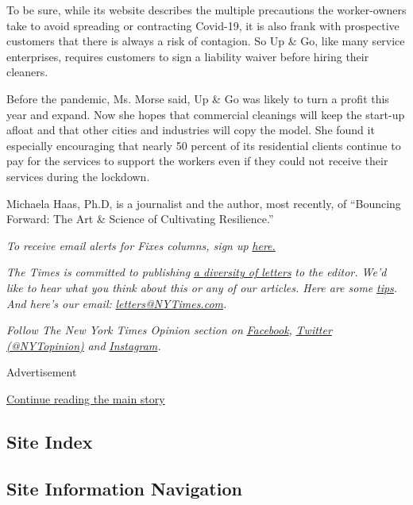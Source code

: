To be sure, while its website describes the multiple precautions the
worker-owners take to avoid spreading or contracting Covid-19, it is
also frank with prospective customers that there is always a risk of
contagion. So Up \& Go, like many service enterprises, requires
customers to sign a liability waiver before hiring their cleaners.

Before the pandemic, Ms. Morse said, Up \& Go was likely to turn a
profit this year and expand. Now she hopes that commercial cleanings
will keep the start-up afloat and that other cities and industries will
copy the model. She found it especially encouraging that nearly 50
percent of its residential clients continue to pay for the services to
support the workers even if they could not receive their services during
the lockdown.

Michaela Haas, Ph.D, is a journalist and the author, most recently, of
``Bouncing Forward: The Art \& Science of Cultivating Resilience.''

\emph{To receive email alerts for Fixes columns, sign up}
\href{http://eepurl.com/ABIxL}{\emph{here.}}

\emph{The Times is committed to publishing}
\href{https://www.nytimes3xbfgragh.onion/2019/01/31/opinion/letters/letters-to-editor-new-york-times-women.html}{\emph{a
diversity of letters}} \emph{to the editor. We'd like to hear what you
think about this or any of our articles. Here are some}
\href{https://help.nytimes3xbfgragh.onion/hc/en-us/articles/115014925288-How-to-submit-a-letter-to-the-editor}{\emph{tips}}\emph{.
And here's our email:}
\href{mailto:letters@NYTimes.com}{\emph{letters@NYTimes.com}}\emph{.}

\emph{Follow The New York Times Opinion section on}
\href{https://www.facebookcorewwwi.onion/nytopinion}{\emph{Facebook}}\emph{,}
\href{http://twitter.com/NYTOpinion}{\emph{Twitter (@NYTopinion)}}
\emph{and}
\href{https://www.instagram.com/nytopinion/}{\emph{Instagram}}\emph{.}

Advertisement

\protect\hyperlink{after-bottom}{Continue reading the main story}

\hypertarget{site-index}{%
\subsection{Site Index}\label{site-index}}

\hypertarget{site-information-navigation}{%
\subsection{Site Information
Navigation}\label{site-information-navigation}}

